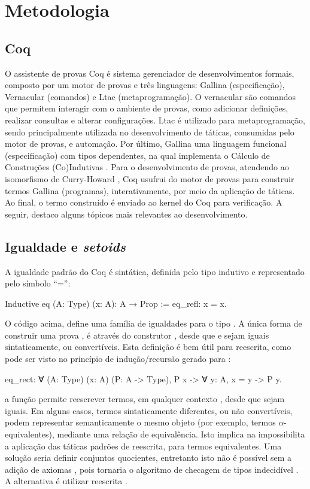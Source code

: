\chapter{Metodologia}\label{chp:metodologia}

\section{Coq}
O assistente de provas Coq \cite{Coq2021} é sistema gerenciador de desenvolvimentos formais, composto por um motor de provas e três linguagens: Gallina (especificação), Vernacular (comandos) e Ltac (metaprogramação). O vernacular são comandos que permitem interagir com o ambiente de provas, como adicionar definições, realizar consultas e alterar configurações. Ltac é utilizado para metaprogramação, sendo principalmente utilizada no desenvolvimento de táticas, consumidas pelo motor de provas, e automação. Por último, Gallina uma linguagem funcional (especificação) com tipos dependentes, na qual implementa o Cálculo de Construções (Co)Indutivas \cite{Coquand1988,Coquand1990,PaulinMohring1993}. Para o desenvolvimento de provas, atendendo ao isomorfismo de Curry-Howard \cite{Soerensen2006}, Coq usufrui do motor de provas para construir termos Gallina (programas), interativamente, por meio da aplicação de táticas. Ao final, o termo construído é enviado ao kernel do Coq para verificação. A seguir, destaco alguns tópicos mais relevantes ao desenvolvimento.

\section{Igualdade e \textit{setoids}}
A igualdade padrão do Coq é sintática, definida pelo tipo indutivo  e representado pelo símbolo ``='':
\begin{coqcode}
Inductive eq (A: Type) (x: A): A → Prop := eq_refl: x = x.	
\end{coqcode}
O código acima, define uma família de igualdades para o tipo . A única forma de construir uma prova , é através do construtor , desde que  e  sejam iguais sintaticamente, ou convertíveis. Esta definição é bem útil para reescrita, como pode ser visto no princípio de indução/recursão gerado para :
\begin{coqcode}
eq_rect: ∀ (A: Type) (x: A) (P: A -> Type), P x -> ∀ y: A, x = y -> P y.
\end{coqcode}
a função  permite reescrever termos, em qualquer contexto , desde que sejam iguais. Em alguns casos, termos sintaticamente diferentes, ou não convertíveis, podem representar semanticamente o mesmo objeto (por exemplo, termos $\alpha$-equivalentes), mediante uma relação de equivalência. Isto implica na impossibilita a aplicação das táticas padrões de reescrita, para termos equivalentes. Uma solução seria definir conjuntos quocientes, entretanto isto não é possível sem a adição de axiomas \cite{Chicli2003}, pois tornaria o algoritmo de checagem de tipos indecidível \cite{Geuvers2002}. A alternativa é utilizar reescrita \setoid. %

